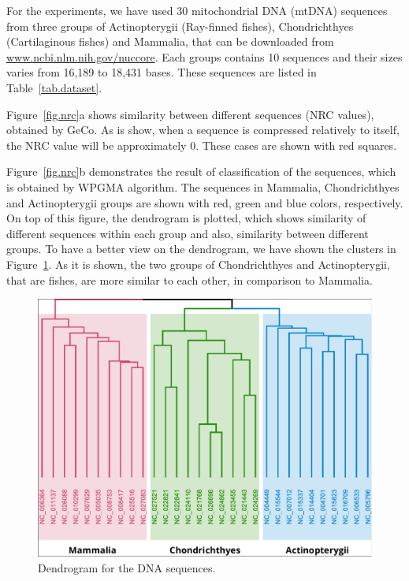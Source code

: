 \documentclass[extendedabs]{recpad2k}
\begin{document}
For the experiments, we have used 30 mitochondrial DNA (mtDNA) sequences from three groups of Actinopterygii (Ray-finned fishes), Chondrichthyes (Cartilaginous fishes) and Mammalia, that can be downloaded from \url{www.ncbi.nlm.nih.gov/nuccore}. Each groups contains 10 sequences and their sizes varies from 16,189 to 18,431 bases. These sequences are listed in Table~\ref{tab.dataset}.

Figure~\ref{fig.nrc}a shows similarity between different sequences (NRC values), obtained by GeCo. As is show, when a sequence is compressed relatively to itself, the NRC value will be approximately 0. These cases are shown with red squares.

Figure~\ref{fig.nrc}b demonstrates the result of classification of the sequences, which is obtained by WPGMA algorithm. The sequences in Mammalia, Chondrichthyes and Actinopterygii groups are shown with red, green and blue colors, respectively. On top of this figure, the dendrogram is plotted, which shows similarity of different sequences within each group and also, similarity between different groups. To have a better view on the dendrogram, we have shown the clusters in Figure~\ref{fig.dend}. As it is shown, the two groups of Chondrichthyes and Actinopterygii, that are fishes, are more similar to each other, in comparison to Mammalia.

\begin{figure}[b!]
   \includegraphics[width=\linewidth]{fig_dend.pdf}
   \caption{Dendrogram for the DNA sequences.}
   \label{fig.dend}
\end{figure}
\end{document}
